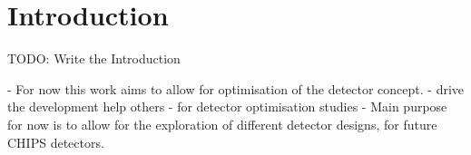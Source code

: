 \chapter{Introduction} %
\label{chap:introduction} %
\setcounter{page}{17}  %

TODO: Write the Introduction

- For now this work aims to allow for optimisation of the \chips detector concept.
- drive the development help others
- for detector optimisation studies
- Main purpose for now is to allow for the exploration of different detector designs, for future
CHIPS detectors.